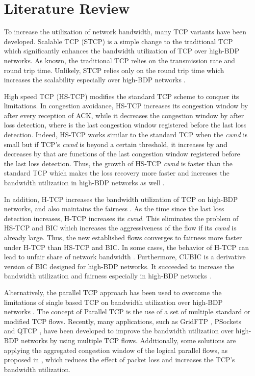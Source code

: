 \documentclass[a4paper, conference]{IEEEtran}
\begin{document}
\section{Literature Review}

To increase the utilization of network bandwidth, many TCP variants have been developed. Scalable TCP (STCP) \cite{kelly2003} is a simple change to the traditional TCP \cite{RFC2581} which significantly enhances the bandwidth utilization of TCP over high-BDP networks. As known, the traditional TCP relies on the transmission rate and round trip time. Unlikely, STCP relies only on the round trip time which increases the scalability especially over high-BDP networks \cite{bateman2008}.

High speed TCP (HS-TCP) \cite{RFC3649} modifies the standard TCP scheme to conquer its limitations. In congestion avoidance, HS-TCP increases its congestion window by  after every reception of ACK,  while it decreases the congestion window by  after loss detection, where  is the last congestion window registered before the last loss detection. Indeed, HS-TCP works similar to the standard TCP when the \textit{cwnd} is small but if TCP's \textit{cwnd} is beyond a certain threshold, it increases by  and decreases by  that are functions of the last congestion window registered before the last loss detection. Thus, the growth of HS-TCP \textit{cwnd} is faster than the standard TCP which makes the loss recovery more faster and increases the bandwidth utilization in high-BDP networks as well \cite{bateman2008}.

In addition, H-TCP \cite{shorten2004} increases the bandwidth utilization of TCP on high-BDP networks, and also maintains the fairness \cite{bateman2008}. As the time since the last loss detection increases, H-TCP increases its \textit{cwnd}. This eliminates the problem of HS-TCP \cite{RFC3649} and BIC \cite{xu2004} which increases the aggressiveness of the flow if its \textit{cwnd} is already large. Thus, the new established flows converges to fairness more faster under H-TCP than HS-TCP and BIC. In some cases, the behavior of H-TCP can lead to unfair share of network bandwidth \cite{bateman2008}. Furthermore, CUBIC \cite{ha2008} is a derivative version of BIC designed for high-BDP networks. It succeeded to increase the bandwidth utilization and fairness especially in high-BDP networks \cite{bateman2008}.

Alternatively, the parallel TCP approach has been used to overcome the limitations of single based TCP on bandwidth utilization over high-BDP networks \cite{lekashman1989, iannucci1992, allman1996}. The concept of Parallel TCP is the use of a set of multiple standard or modified TCP flows. Recently, many applications, such as GridFTP \cite{allcock2002,allcock2005}, PSockets \cite{sivakumar2000,grossman2003} and QTCP \cite{qureshi2012}, have been developed to improve the bandwidth utilization over high-BDP networks by using multiple TCP flows. Additionally, some solutions are applying the aggregated congestion window of the logical parallel flows, as proposed in \cite{balakrishnan1999,eggert2000,hacker2004b,hacker2002}, which reduces the effect of packet loss and increases the TCP's bandwidth utilization.
\end{document}
